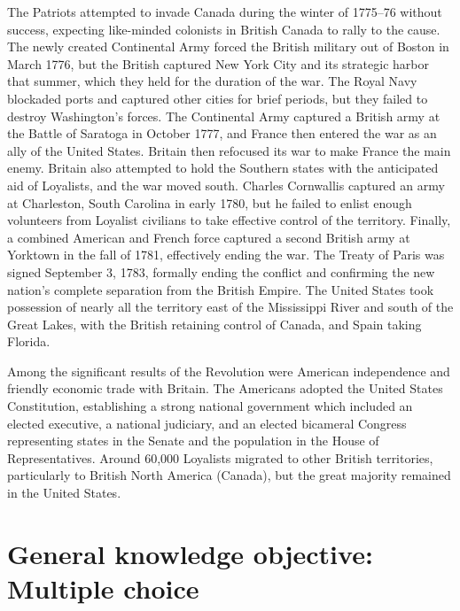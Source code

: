 \documentclass[
  openany]{book}
\begin{document}
The Patriots attempted to invade Canada during the winter of 1775--76 without success, expecting like-minded colonists in British Canada to rally to the cause. The newly created Continental Army forced the British military out of Boston in March 1776, but the British captured New York City and its strategic harbor that summer, which they held for the duration of the war. The Royal Navy blockaded ports and captured other cities for brief periods, but they failed to destroy Washington's forces. The Continental Army captured a British army at the Battle of Saratoga in October 1777, and France then entered the war as an ally of the United States. Britain then refocused its war to make France the main enemy. Britain also attempted to hold the Southern states with the anticipated aid of Loyalists, and the war moved south. Charles Cornwallis captured an army at Charleston, South Carolina in early 1780, but he failed to enlist enough volunteers from Loyalist civilians to take effective control of the territory. Finally, a combined American and French force captured a second British army at Yorktown in the fall of 1781, effectively ending the war. The Treaty of Paris was signed September 3, 1783, formally ending the conflict and confirming the new nation's complete separation from the British Empire. The United States took possession of nearly all the territory east of the Mississippi River and south of the Great Lakes, with the British retaining control of Canada, and Spain taking Florida.

Among the significant results of the Revolution were American independence and friendly economic trade with Britain. The Americans adopted the United States Constitution, establishing a strong national government which included an elected executive, a national judiciary, and an elected bicameral Congress representing states in the Senate and the population in the House of Representatives. Around 60,000 Loyalists migrated to other British territories, particularly to British North America (Canada), but the great majority remained in the United States.

\hypertarget{general-knowledge-objective-multiple-choice}{%
\chapter{General knowledge objective: Multiple choice}\label{general-knowledge-objective-multiple-choice}}



  
\end{document}
